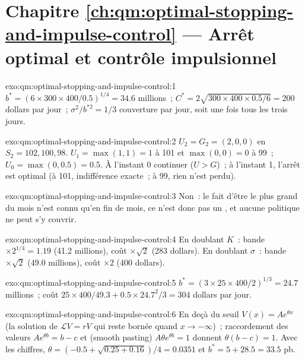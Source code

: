 \section*{Chapitre \ref{ch:qm:optimal-stopping-and-impulse-control} --- Arrêt optimal et contrôle impulsionnel}

\begin{solution}{exo:qm:optimal-stopping-and-impulse-control:1}
$b^* = (6 \times 300 \times 400/0.5)^{1/4} = 34.6$ millions~; $C^* = 2\sqrt{300 \times 400 \times 0.5/6} = 200$ dollars par jour~; $\sigma^2/b^{*2} = 1/3$ couverture
par jour, soit une fois tous les trois jours.
\end{solution}

\begin{solution}{exo:qm:optimal-stopping-and-impulse-control:2}
$U_2 = G_2 = (2, 0, 0)$ en $S_2 = 102, 100, 98$. $U_1 = \max(1, 1) = 1$ à 101 et $\max(0, 0) = 0$ à 99~; $U_0 = \max(0, 0.5) = 0.5$. À l'instant 0
continuer ($U > G$)~; à l'instant 1, l'arrêt est optimal (à 101, indifférence exacte~; à 99, rien n'est perdu).
\end{solution}

\begin{solution}{exo:qm:optimal-stopping-and-impulse-control:3}
Non~: le fait d'être le plus grand du mois n'est connu qu'en fin de mois, ce n'est donc pas un , et aucune politique ne peut
s'y couvrir.
\end{solution}

\begin{solution}{exo:qm:optimal-stopping-and-impulse-control:4}
En doublant $K$~: bande $\times 2^{1/4} = 1.19$ (41.2 millions), coût $\times\sqrt2$ (283 dollars). En doublant $\sigma$~: bande $\times\sqrt2$ (49.0 millions), coût $\times 2$
(400 dollars).
\end{solution}

\begin{solution}{exo:qm:optimal-stopping-and-impulse-control:5}
$b^* = (3 \times 25 \times 400/2)^{1/3} = 24.7$ millions~; coût $25 \times 400/49.3 + 0.5 \times 24.7^2/3 = 304$ dollars par jour.
\end{solution}

\begin{solution}{exo:qm:optimal-stopping-and-impulse-control:6}
En deçà du seuil $V(x) = Ae^{\theta x}$ (la solution de $\mathcal LV = rV$ qui reste bornée quand $x \to -\infty$)~; raccordement des valeurs $Ae^{\theta b} = b - c$ et
 (smooth pasting) $A\theta e^{\theta b} = 1$ donnent $\theta(b - c) = 1$. Avec les chiffres, $\theta = (-0.5 + \sqrt{0.25 + 0.16})/4 = 0.0351$ et $b^* = 5 + 28.5 =
33.5$ pb.
\end{solution}

